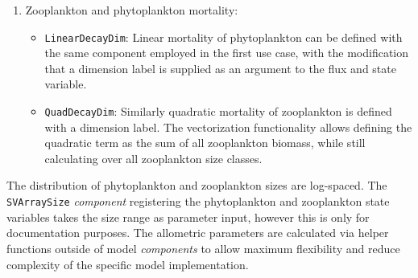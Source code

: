 \documentclass[journal abbreviation, manuscript]{copernicus}
\begin{document}
\begin{enumerate}
        \item Zooplankton and phytoplankton mortality: 
    \begin{itemize}
        \item \texttt{LinearDecayDim}: Linear mortality of phytoplankton can be defined with the same component employed in the first use case, with the modification that a dimension label is supplied as an argument to the flux and state variable. 
        \item \texttt{QuadDecayDim}: Similarly quadratic mortality of zooplankton is defined with a dimension label. The vectorization functionality allows defining the quadratic term as the sum of all zooplankton biomass, while still calculating over all zooplankton size classes.
    \end{itemize}
\end{enumerate}

The distribution of phytoplankton and zooplankton sizes are log-spaced. The \texttt{SVArraySize} \textit{component} registering the phytoplankton and zooplankton state variables takes the size range as parameter input, however this is only for documentation purposes. The allometric parameters are calculated via helper functions outside of model \textit{components} to allow maximum flexibility and reduce complexity of the specific model implementation.
\end{document}
